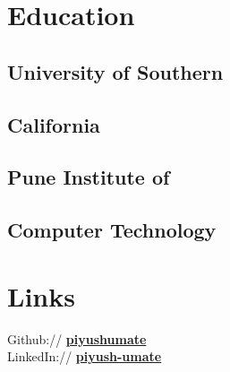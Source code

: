 \documentclass[]{deedy-resume}
\begin{document}
%
%
\lastupdated

%
%

%
%

\begin{minipage}[t]{0.33\textwidth} 


\section{Education} 

\subsection{University of Southern}
\subsection{California}
\sectionsep

\subsection{Pune Institute of}
\subsection{Computer Technology}
\sectionsep



\section{Links} 
Github:// \href{https://github.com/piyushumate}{\bf piyushumate} \\
LinkedIn://  \href{https://www.linkedin.com/in/piyush-umate}{\bf piyush-umate} \\


\end{minipage}
\end{document}
